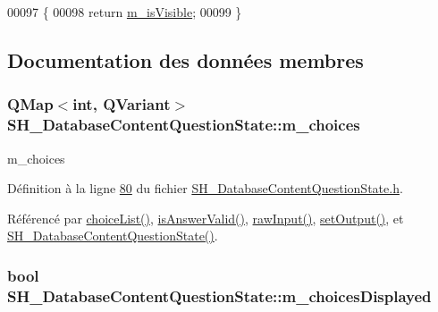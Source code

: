 \begin{DoxyCode}
00097                                \{
00098     \textcolor{keywordflow}{return} \hyperlink{classSH__InOutState_a8fd66b185c9a55f0e84daa97e2acf53a}{m\_isVisible};
00099 \}
\end{DoxyCode}


\subsection{Documentation des données membres}
\hypertarget{classSH__DatabaseContentQuestionState_a0bbbd0d3b22877dc9e78f81136f31618}{
\subsubsection[{m\-\_\-choices}]{\setlength{\rightskip}{0pt plus 5cm}Q\-Map$<$int, Q\-Variant$>$ S\-H\-\_\-\-Database\-Content\-Question\-State\-::m\-\_\-choices\hspace{0.3cm}{\ttfamily [private]}}}\label{classSH__DatabaseContentQuestionState_a0bbbd0d3b22877dc9e78f81136f31618}


m\-\_\-choices 



Définition à la ligne \hyperlink{SH__DatabaseContentQuestionState_8h_source_l00080}{80} du fichier \hyperlink{SH__DatabaseContentQuestionState_8h_source}{S\-H\-\_\-\-Database\-Content\-Question\-State.\-h}.



Référencé par \hyperlink{classSH__DatabaseContentQuestionState_a14ca81b7c20c9e20e9d9e327b513f6ec}{choice\-List()}, \hyperlink{classSH__DatabaseContentQuestionState_a9bd6d20076c08d8e4085d22883ab7d14}{is\-Answer\-Valid()}, \hyperlink{classSH__DatabaseContentQuestionState_aed9d5e4205ca37d32653475ac13fe097}{raw\-Input()}, \hyperlink{classSH__DatabaseContentQuestionState_aaec6c7f8bc78c6beb7447fc41ffe3875}{set\-Output()}, et \hyperlink{classSH__DatabaseContentQuestionState_ab26490ea519262a8f9ca72c000bf7313}{S\-H\-\_\-\-Database\-Content\-Question\-State()}.

\hypertarget{classSH__DatabaseContentQuestionState_aff4d8f402d9299029038ec4f21271b2b}{
\subsubsection[{m\-\_\-choices\-Displayed}]{\setlength{\rightskip}{0pt plus 5cm}bool S\-H\-\_\-\-Database\-Content\-Question\-State\-::m\-\_\-choices\-Displayed\hspace{0.3cm}{\ttfamily [private]}}}\label{classSH__DatabaseContentQuestionState_aff4d8f402d9299029038ec4f21271b2b}


